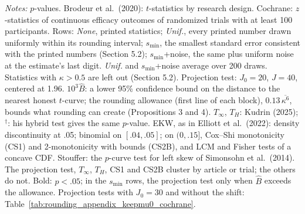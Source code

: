 \begin{table}[htbp]
\medskip
\begin{minipage}{\linewidth}
\footnotesize
\textit{Notes:} $p$-values. Brodeur et al.\ (2020): $t$-statistics by research design. Cochrane: $z$-statistics of continuous efficacy outcomes of randomized trials with at least 100 participants.
Rows: \textit{None}, printed statistics; \textit{Unif.}, every printed number drawn uniformly within its rounding interval; $s_{\min}$, the smallest standard error consistent with the printed numbers (Section 5.2); $s_{\min}$+noise, the same plus uniform noise at the estimate's last digit. \textit{Unif.} and $s_{\min}$+noise average over 200 draws.
Statistics with $\kappa>0.5$ are left out (Section 5.2).
Projection test: $J_0=20$, $J=40$, centered at 1.96. $10^3\widehat{B}$: a lower 95\% confidence bound on the distance to the nearest honest $t$-curve; the rounding allowance (first line of each block), $0.13\,\overline{\kappa^6}$, bounds what rounding can create (Propositions 3 and 4).
$T_\infty$, $T_H$: Kudrin (2025); $^\dagger$: his hybrid test gives the same $p$-value.
EKW, as in Elliott et al.\ (2022): density discontinuity at .05; binomial on $[.04,.05]$; on $(0,.15]$, Cox--Shi monotonicity (CS1) and 2-monotonicity with bounds (CS2B), and LCM and Fisher tests of a concave CDF.
Stouffer: the $p$-curve test for left skew of Simonsohn et al.\ (2014).
The projection test, $T_\infty$, $T_H$, CS1 and CS2B cluster by article or trial; the others do not.
Bold: $p<.05$; in the $s_{\min}$ rows, the projection test only when $\widehat{B}$ exceeds the allowance.
Projection tests with $J_0=30$ and without the shift: Table~\ref{tab:rounding_appendix_keepmu0_cochrane}.
\end{minipage}
\end{table}
